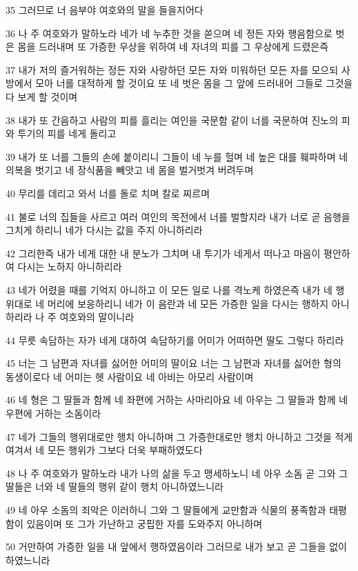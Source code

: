 \par 35 그러므로 너 음부야 여호와의 말을 들을지어다
\par 36 나 주 여호와가 말하노라 네가 네 누추한 것을 쏟으며 네 정든 자와 행음함으로 벗은 몸을 드러내며 또 가증한 우상을 위하여 네 자녀의 피를 그 우상에게 드렸은즉
\par 37 내가 저의 즐거워하는 정든 자와 사랑하던 모든 자와 미워하던 모든 자를 모으되 사방에서 모아 너를 대적하게 할 것이요 또 네 벗은 몸을 그 앞에 드러내어 그들로 그것을 다 보게 할 것이며
\par 38 내가 또 간음하고 사람의 피를 흘리는 여인을 국문함 같이 너를 국문하여 진노의 피와 투기의 피를 네게 돌리고
\par 39 내가 또 너를 그들의 손에 붙이리니 그들이 네 누를 헐며 네 높은 대를 훼파하며 네 의복을 벗기고 네 장식품을 빼앗고 네 몸을 벌거벗겨 버려두며
\par 40 무리를 데리고 와서 너를 돌로 치며 칼로 찌르며
\par 41 불로 너의 집들을 사르고 여러 여인의 목전에서 너를 벌할지라 내가 너로 곧 음행을 그치게 하리니 네가 다시는 값을 주지 아니하리라
\par 42 그리한즉 내가 네게 대한 내 분노가 그치며 내 투기가 네게서 떠나고 마음이 평안하여 다시는 노하지 아니하리라
\par 43 네가 어렸을 때를 기억지 아니하고 이 모든 일로 나를 격노케 하였은즉 내가 네 행위대로 네 머리에 보응하리니 네가 이 음란과 네 모든 가증한 일을 다시는 행하지 아니하리라 나 주 여호와의 말이니라
\par 44 무릇 속담하는 자가 네게 대하여 속담하기를 어미가 어떠하면 딸도 그렇다 하리라
\par 45 너는 그 남편과 자녀를 싫어한 어미의 딸이요 너는 그 남편과 자녀를 싫어한 형의 동생이로다 네 어미는 헷 사람이요 네 아비는 아모리 사람이며
\par 46 네 형은 그 딸들과 함께 네 좌편에 거하는 사마리아요 네 아우는 그 딸들과 함께 네 우편에 거하는 소돔이라
\par 47 네가 그들의 행위대로만 행치 아니하며 그 가증한대로만 행치 아니하고 그것을 적게 여겨서 네 모든 행위가 그보다 더욱 부패하였도다
\par 48 나 주 여호와가 말하노라 내가 나의 삶을 두고 맹세하노니 네 아우 소돔 곧 그와 그 딸들은 너와 네 딸들의 행위 같이 행치 아니하였느니라
\par 49 네 아우 소돔의 죄악은 이러하니 그와 그 딸들에게 교만함과 식물의 풍족함과 태평함이 있음이며 또 그가 가난하고 궁핍한 자를 도와주지 아니하며
\par 50 거만하여 가증한 일을 내 앞에서 행하였음이라 그러므로 내가 보고 곧 그들을 없이 하였느니라
